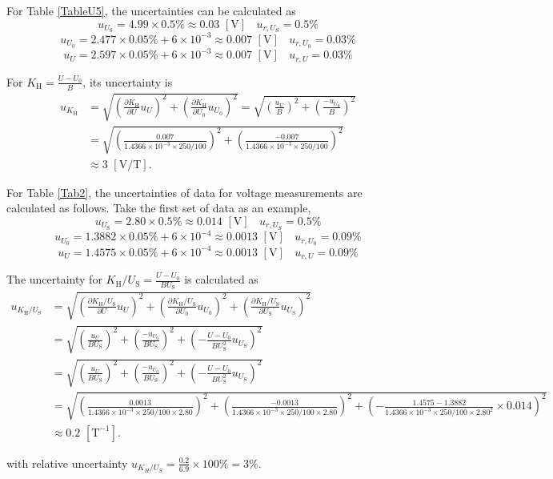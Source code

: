 \documentclass{article}
\begin{document}
For Table \ref{TableU5}, the uncertainties can be calculated as
$$u_{U_\text{S}} = 4.99\times 0.5\% \approx 0.03\,\,[\text{V}]~~~~u_{r,U_S} = 0.5\%$$
$$u_{U_0} = 2.477\times0.05\%+6\times10^{-3} \approx 0.007\,\,[\text{V}]~~~~u_{r,U_0} = 0.03\%$$
$$u_U = 2.597\times0.05\%+6\times10^{-3} \approx 0.007\,\,[\text{V}]~~~~u_{r,U} = 0.03\%$$

For $K_\text{H} = \frac{U-U_0}{B}$, its uncertainty is
\begin{align*}
u_{K_\text{H}} &= \sqrt{(\frac{\partial K_\text{H}}{\partial U}u_U)^2+(\frac{\partial K_\text{H}}{\partial U_0}u_{U_0})^2} = \sqrt{(\frac{u_U}{B})^2+(\frac{-u_{U_0}}{B})^2} \\
&=\sqrt{(\frac{0.007}{1.4366\times10^{-3}\times250/100})^2+(\frac{-0.007}{1.4366\times10^{-3}\times250/100})^2} \\&\approx 3\,\,[\text{V}/\text{T}].
\end{align*}


For Table \ref{Tab2}, the uncertainties of data for voltage measurements are calculated as follows. Take the first set of data as an example, 
$$u_{U_\text{S}} = 2.80\times 0.5\% \approx 0.014\,\,[\text{V}]~~~~u_{r,U_S} = 0.5\%$$
$$u_{U_0} = 1.3882\times0.05\%+6\times10^{-4} \approx 0.0013\,\,[\text{V}]~~~~u_{r,U_0} = 0.09\%$$
$$u_U = 1.4575\times0.05\%+6\times10^{-4} \approx 0.0013\,\,[\text{V}]~~~~u_{r,U} = 0.09\%$$

The uncertainty for $ \displaystyle K_\text{H}/U_\text{S} = \frac{U-U_0}{BU_\text{S}}$ is calculated as
\begin{align*}
u_{K_\text{H}/U_\text{S}} &= \sqrt{(\frac{\partial K_\text{H}/U_\text{S}}{\partial U}u_U)^2+(\frac{\partial K_\text{H}/U_\text{S}}{\partial U_0}u_{U_0})^2+(\frac{\partial K_\text{H}/U_\text{S}}{\partial U_\text{S}}u_{U_\text{S}})^2} \\
&= \sqrt{(\frac{u_U}{BU_\text{S}})^2+(\frac{-u_{U_0}}{BU_\text{S}})^2+(-\frac{U-U_0}{BU_\text{S}^2}u_{U_\text{S}})^2} \\
&= \sqrt{(\frac{u_U}{BU_\text{S}})^2+(\frac{-u_{U_0}}{BU_\text{S}})^2+(-\frac{U-U_0}{BU_\text{S}^2}u_{U_\text{S}})^2} \\
&= \sqrt{(\frac{0.0013}{1.4366\times10^{-3}\times250/100\times2.80})^2+(\frac{-0.0013}{1.4366\times10^{-3}\times250/100 \times2.80})^2+(-\frac{1.4575-1.3882}{1.4366\times10^{-3}\times250/100 \times2.80^2}\times0.014)^2} \\
&\approx0.2\,\,[\text{T}^{-1}].
\end{align*}

with relative uncertainty $u_{K_H/U_S} = \frac{0.2}{6.9} \times 100\% = 3\%.$
\end{document}
